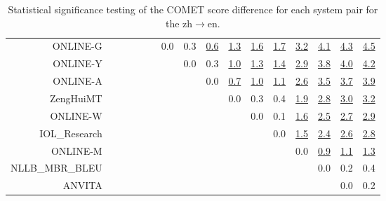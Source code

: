 \documentclass[11pt]{article}
\begin{document}
\begin{sidewaystable}
\begin{center}
{\begin{tabular}{rccccccccccccccc}
ONLINE-G &  &  &  &  &  & \cellcolor{red!0} 0.0 & \cellcolor{red!50} 0.3 & \cellcolor{red!70} \underline{0.6} & \cellcolor{red!70} \underline{1.3} & \cellcolor{red!70} \underline{1.6} & \cellcolor{red!70} \underline{1.7} & \cellcolor{red!70} \underline{3.2} & \cellcolor{red!70} \underline{4.1} & \cellcolor{red!70} \underline{4.3} & \cellcolor{red!70} \underline{4.5}\\ 
ONLINE-Y &  &  &  &  &  &  & \cellcolor{red!0} 0.0 & \cellcolor{red!60} 0.3 & \cellcolor{red!70} \underline{1.0} & \cellcolor{red!70} \underline{1.3} & \cellcolor{red!70} \underline{1.4} & \cellcolor{red!70} \underline{2.9} & \cellcolor{red!70} \underline{3.8} & \cellcolor{red!70} \underline{4.0} & \cellcolor{red!70} \underline{4.2}\\ 
ONLINE-A &  &  &  &  &  &  &  & \cellcolor{red!0} 0.0 & \cellcolor{red!70} \underline{0.7} & \cellcolor{red!70} \underline{1.0} & \cellcolor{red!70} \underline{1.1} & \cellcolor{red!70} \underline{2.6} & \cellcolor{red!70} \underline{3.5} & \cellcolor{red!70} \underline{3.7} & \cellcolor{red!70} \underline{3.9}\\ 
ZengHuiMT &  &  &  &  &  &  &  &  & \cellcolor{red!0} 0.0 & \cellcolor{red!0} 0.3 & \cellcolor{red!50} 0.4 & \cellcolor{red!70} \underline{1.9} & \cellcolor{red!70} \underline{2.8} & \cellcolor{red!70} \underline{3.0} & \cellcolor{red!70} \underline{3.2}\\ 
ONLINE-W &  &  &  &  &  &  &  &  &  & \cellcolor{red!0} 0.0 & \cellcolor{red!0} 0.1 & \cellcolor{red!70} \underline{1.6} & \cellcolor{red!70} \underline{2.5} & \cellcolor{red!70} \underline{2.7} & \cellcolor{red!70} \underline{2.9}\\ 
IOL\_Research &  &  &  &  &  &  &  &  &  &  & \cellcolor{red!0} 0.0 & \cellcolor{red!70} \underline{1.5} & \cellcolor{red!70} \underline{2.4} & \cellcolor{red!70} \underline{2.6} & \cellcolor{red!70} \underline{2.8}\\ 
ONLINE-M &  &  &  &  &  &  &  &  &  &  &  & \cellcolor{red!0} 0.0 & \cellcolor{red!70} \underline{0.9} & \cellcolor{red!70} \underline{1.1} & \cellcolor{red!70} \underline{1.3}\\ 
NLLB\_MBR\_BLEU &  &  &  &  &  &  &  &  &  &  &  &  & \cellcolor{red!0} 0.0 & \cellcolor{red!0} 0.2 & \cellcolor{red!60} 0.4\\ 
ANVITA &  &  &  &  &  &  &  &  &  &  &  &  &  & \cellcolor{red!0} 0.0 & \cellcolor{red!0} 0.2\\ 
\bottomrule 
\end{tabular} }
\caption{Statistical significance testing of the COMET score difference for each system pair for the zh$\rightarrow$en.} 
 \end{center} \end{sidewaystable} 
 
\end{document}
